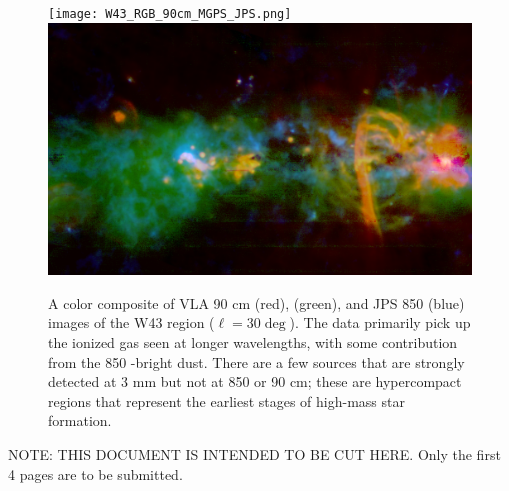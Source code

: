 \documentclass[11pt,preprint]{aastex_nofoot}
\begin{document}
\begin{figure}
\texttt{[image: W43\_RGB\_90cm\_MGPS\_JPS.png]}
\includegraphics[width=18cm]{SgrB2_RGB_20cm_MGPSplanck_ATLASGAL.png}
\caption{
A color composite of VLA 90 cm (red), \MUSTANG (green), and JPS 850 \um (blue)
images of the W43 region ($\ell=30\deg$).  The \MUSTANG data primarily pick up
the ionized gas seen at longer wavelengths, with some contribution from the 
850 \um-bright dust.  There are a few sources that are strongly detected at 3 mm
but not at 850 \um or 90 cm; these are hypercompact \hii regions that represent
the earliest stages of high-mass star formation.
}
\label{fig:figure}
\end{figure}

\clearpage

NOTE: THIS DOCUMENT IS INTENDED TO BE CUT HERE.  Only the first 4 pages are to be submitted.


% 
% 
% 
\end{document}
